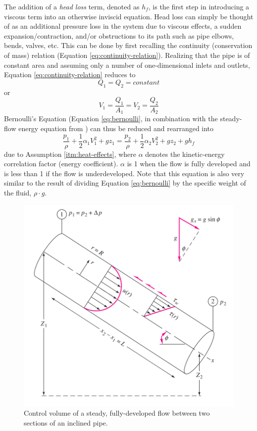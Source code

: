 \documentclass[11pt]{article} %
\numberwithin{equation}{section} %
\begin{document}
The addition of a \textit{head loss} term, denoted as $h_{f}$, is the first step in introducing a viscous term into an otherwise inviscid equation. Head loss can simply be thought of as an additional pressure loss in the system due to viscous effects, a sudden expansion/contraction, and/or obstructions to its path such as pipe elbows, bends, valves, etc. This can be done by first recalling the continuity (conservation of mass) relation (Equation \ref{eq:continuity-relation}). Realizing that the pipe is of constant area and assuming only a number of one-dimensional inlets and outlets, Equation \ref{eq:continuity-relation} reduces to
\begin{equation} \label{eq:equal-q}
Q_{1} = Q_{2} = constant
\end{equation}
or
\begin{equation} \label{eq:equal-v}
V_{1} = \frac{Q_{1}}{A_{1}} = V_{2} = \frac{Q_{2}}{A_{2}}
\end{equation}
Bernoulli's Equation (Equation \ref{eq:bernoulli}, in combination with the steady-flow energy equation from \cite{fluid-mechanics}) can thus be reduced and rearranged into
\begin{equation} \label{eq:steady-flow-energy}
\frac{p_{1}}{\rho} + \frac{1}{2} \alpha_{1} V^{2}_{1} + gz_{1} = \frac{p_{2}}{\rho} + \frac{1}{2} \alpha_{2} V^{2}_{2} + gz_{2} + gh_{f}
\end{equation}
due to Assumption \ref{itm:heat-effects}, where $\alpha$ denotes the kinetic-energy correlation factor (energy coefficient). $\alpha$ is 1 when the flow is fully developed and is less than 1 if the flow is underdeveloped. Note that this equation is also very similar to the result of dividing Equation \ref{eq:bernoulli} by the specific weight of the fluid, $\rho \cdot g$.
\begin{figure}[h]
\centering
\includegraphics[scale=0.45]{inclined_pipe}
\caption{Control volume of a steady, fully-developed flow between two sections of an inclined pipe.}
\label{fig:inclined-pipe}
\end{figure}
\end{document}
